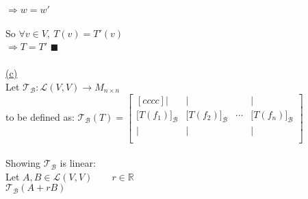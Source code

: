 \documentclass[12pt]{article}
\newcommand{\R}{\mathbb{R}}
\renewcommand{\qed}{\hfill$\blacksquare$}
\begin{document}
$\Longrightarrow w = w'$
	\\\\
	So $\forall  v \in V,\ T(v) = T'(v)$\\
$\Longrightarrow T = T'$ \qed
	\\\\
	\newpage
	\hyperlink{toc}{\hypertarget{4.3}{(c)}}\\
	Let $\mathcal{T}_\mathcal{B} : \mathcal{L}(V,V) \longrightarrow M_{n\times n} $\\
	to be defined as: $\mathcal{T}_\mathcal{B} \left(T\right) = \begin{bmatrix}[cccc]
	|                            & |                            &        & |                            \\
	\big[T(f_1)\big]_\mathcal{B} & \big[T(f_2)\big]_\mathcal{B} & \cdots & \big[T(f_n)\big]_\mathcal{B} \\
	|                            & |                            &        & |                            \\
\end{bmatrix}$
	\\\\
	Showing $\mathcal{T}_\mathcal{B}$ is linear:\\
	Let $A, B \in \mathcal{L}(V,V) \qquad r \in \R$\\
$\mathcal{T}_\mathcal{B}\left( A + rB \right) $\\
\end{document}
